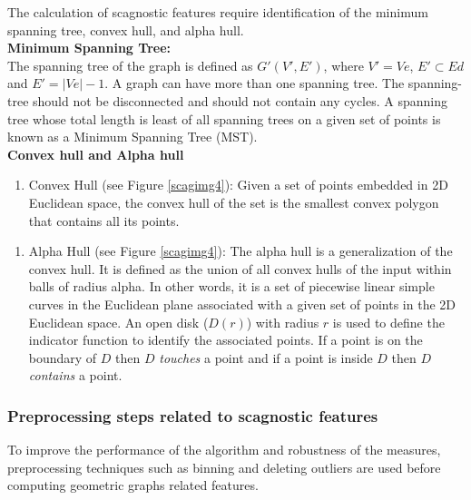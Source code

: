 \documentclass{article}
\newcommand{\tightlist}{%
\setlength{\itemsep}{0pt}\setlength{\parskip}{0pt}}
\begin{document}
The calculation of scagnostic features require identification of the
minimum spanning tree, convex hull, and alpha hull.\\

\textbf{Minimum Spanning Tree:}\\

The spanning tree of the graph is defined as \(G'(V', E')\), where
\(V' = Ve\), \(E' \subset Ed\) and \(E' = |Ve|-1\). A graph can have
more than one spanning tree. The spanning-tree should not be disconnected
and should not contain any cycles. A spanning tree whose total length is
least of all spanning trees on a given set of points is known as a
Minimum Spanning Tree (MST).\\

\textbf{Convex hull and Alpha hull}

\begin{enumerate}
\def\labelenumi{\roman{enumi})}
\tightlist
\item
  Convex Hull (see Figure \ref{scagimg4}): Given a set of points
  embedded in 2D Euclidean space, the convex hull of the set is the
  smallest convex polygon that contains all its points.
\end{enumerate}

\begin{enumerate}
\def\labelenumi{\roman{enumi})}
\setcounter{enumi}{1}
\tightlist
\item
  Alpha Hull (see Figure \ref{scagimg4}): The alpha hull is a
  generalization of the convex hull. It is defined as the union of all
  convex hulls of the input within balls of radius alpha. In other words,
  it is a set of piecewise linear simple curves in the Euclidean plane
  associated with a given set of points in the 2D Euclidean space. An open
  disk (\(D(r)\)) with radius \(r\) is used to define the indicator
  function to identify the associated points. If a point is on the
  boundary of \(D\) then \(D\) \textit{touches} a point and if a point
  is inside \(D\) then \(D\) \textit{contains} a point.
\end{enumerate}

\hypertarget{preprocessing-steps-related-to-scagnostic-features}{%
\subsubsection{Preprocessing steps related to scagnostic
features}\label{preprocessing-steps-related-to-scagnostic-features}}

To improve the performance of the algorithm and robustness of
the measures, preprocessing techniques such as binning and deleting
outliers are used before computing geometric graphs related features.
\end{document}
